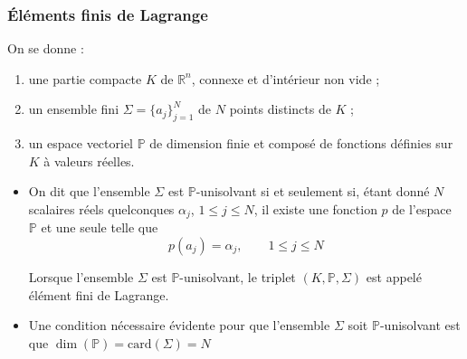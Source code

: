 \documentclass{beamer}
\begin{document}
\begin{frame}
\frametitle{Éléments finis de Lagrange}
  On se donne :
  \begin{enumerate}
  \item une partie compacte $K$ de $\mathbb{R}^n$, connexe et d'intérieur non vide ; 
  \item un ensemble fini $\Sigma =\{a_j\}_{j=1}^N$ de $N$ points distincts de $K$ ;
  \item un espace vectoriel $\mathbb{P}$ de dimension finie et composé de fonctions définies 
sur $K$ à valeurs réelles.
  \end{enumerate}  
  \begin{itemize}
\item On dit que l'ensemble $\Sigma$ est $\mathbb{P}$-unisolvant si et seulement si, étant donné $N$ scalaires réels quelconques $\alpha_j$, $1\leq j \leq N$, il existe une fonction $p$ de l'espace $\mathbb{P}$ et une seule telle que
                          \begin{equation}
                          p(a_j)=\alpha_j,\qquad 1\leq j \leq N
                          \end{equation}

Lorsque l'ensemble $\Sigma$ est $\mathbb{P}$-unisolvant, le triplet $(K, \mathbb{P}, \Sigma)$ est appelé élément fini de Lagrange.
\item Une condition nécessaire évidente pour que l'ensemble $\Sigma$ soit 
$\mathbb{P}$-unisolvant est que $\dim(\mathbb{P})=\mbox{card}(\Sigma)=N$
  \end{itemize}
\end{frame}
\end{document}
